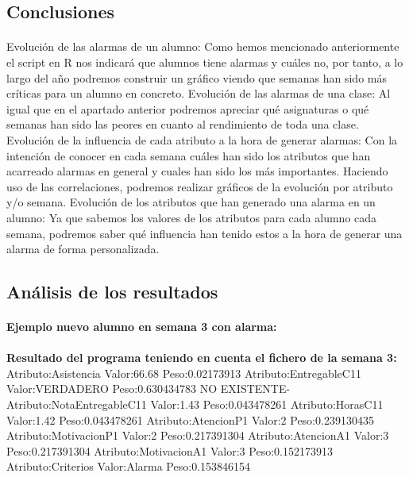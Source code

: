 
\subsection{Conclusiones}
\paragraph{}

Evolución de las alarmas de un alumno:
Como hemos mencionado anteriormente el script en R nos indicará que alumnos tiene alarmas y cuáles no, por tanto, a lo largo del año podremos construir un gráfico viendo que semanas han sido más críticas para un alumno en concreto.
            Evolución de las alarmas de una clase:
Al igual que en el apartado anterior podremos apreciar qué asignaturas o qué semanas han sido las peores en cuanto al rendimiento de toda una clase.
            Evolución de la influencia de cada atributo a la hora de generar alarmas:
Con la intención de conocer en cada semana cuáles han sido los atributos que han acarreado alarmas en general y cuales han sido los más importantes. Haciendo uso de las correlaciones, podremos realizar gráficos de la evolución por atributo y/o semana.
            Evolución de los atributos que han generado una alarma en un alumno:
Ya que sabemos los valores de los atributos para cada alumno cada semana, podremos saber qué influencia han tenido estos a la hora de generar una alarma de forma personalizada.

\subsection{Análisis de los resultados}
\paragraph{}
\textbf{Ejemplo nuevo alumno en semana 3 con alarma:}

\paragraph{}
\paragraph{}
\textbf{Resultado del programa teniendo en cuenta el fichero de la semana 3:} 
Atributo:Asistencia Valor:66.68 Peso:0.02173913
Atributo:EntregableC11 Valor:VERDADERO Peso:0.630434783
NO EXISTENTE-Atributo:NotaEntregableC11 Valor:1.43 Peso:0.043478261
Atributo:HorasC11 Valor:1.42 Peso:0.043478261
Atributo:AtencionP1 Valor:2 Peso:0.239130435
Atributo:MotivacionP1 Valor:2 Peso:0.217391304
Atributo:AtencionA1 Valor:3 Peso:0.217391304
Atributo:MotivacionA1 Valor:3 Peso:0.152173913
Atributo:Criterios Valor:Alarma Peso:0.153846154

